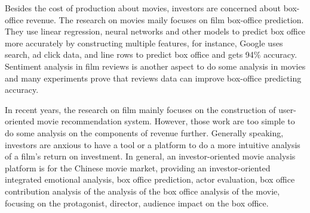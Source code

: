 \par Besides the cost of production about movies, investors are concerned about box-office revenue. The research on movies maily focuses on film box-office prediction\cite{marshall2013forecasting,basuroy2003critical,asur2010predicting}. They use linear regression, neural networks\cite{sharda2006predicting} and other models to predict box office more accurately by constructing multiple features, for instance, Google \cite{panaligan2013quantifying} uses search, ad click data, and line rows to predict box office and gets 94\% accuracy. Sentiment analysis in film reviews \cite{manek2017aspect,kiritchenko2014sentiment,pang2008opinion} is another aspect to do some analysis in movies and many experiments\cite{gemser2007impact,joshi2010movie} prove that reviews data can improve box-office predicting accuracy.
\par In recent years, the research on film mainly focuses on the construction of user-oriented movie recommendation system\cite{diao2014jointly,tang2015user}. However, those work are too simple to do some analysis on the components of revenue further. Generally speaking, investors are anxious to have a tool or a platform to do a more intuitive analysis of a film's return on investment. In general, an investor-oriented movie analysis platform is for the Chinese movie market, providing an investor-oriented integrated emotional analysis, box office prediction, actor evaluation, box office contribution analysis of the analysis of the box office analysis of the movie, focusing on the protagonist, director, audience impact on the box office.
